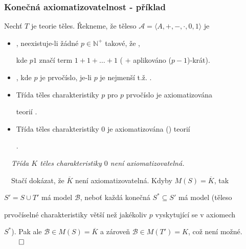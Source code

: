     
    
    \subsubsection*{Konečná axiomatizovatelnost - příklad}
    
    Nechť $T$ je teorie těles. Řekneme, že těleso $\mathcal{A}=\langle A,+,-,\cdot,0,1 \rangle$ je
    
    \begin{itemize}
    \item {}, neexistuje-li žádné $p\in \mathbb{N}^+$ takové, že ,
    \smallskip
    
    kde $p1$ značí term $1+1+\dots+1$ ( $+$ aplikováno ($p-1$)-krát).
    \smallskip
    
    \item {}, kde $p$ je prvočíslo, je-li $p$ je nejmenší t.ž. .
    \smallskip
    
    \item Třída těles charakteristiky $p$ pro $p$ prvočíslo je  axiomatizována
    \smallskip
    
    teorií .
    \smallskip
    
    \item Třída těles charakteristiky $0$ je axiomatizována () teorií
    \smallskip
    
    .
    \end{itemize}
    \medskip
    
    {\bf {}}\ \ {\it Třída $K$ těles charakteristiky $0$ není  axiomatizovatelná.}
    \medskip
    
    {\it {}}\ \ Stačí dokázat, že $\overline{K}$ není axiomatizovatelná. Kdyby $M(S)=\overline{K}$, tak
    \smallskip
    
    $S'=S\cup T'$ má model $\mathcal{B}$, neboť každá konečná $S^*\subseteq S'$ má model (těleso
    \smallskip
    
    prvočíselné charakteristiky větší než jakékoliv $p$ vyskytující se v axiomech
    \smallskip
    
    $S^*$). Pak ale $\mathcal{B}\in M(S)=\overline{K}$ a zároveň $\mathcal{B}\in M(T')=K$, což není možné. $\qed$
    
